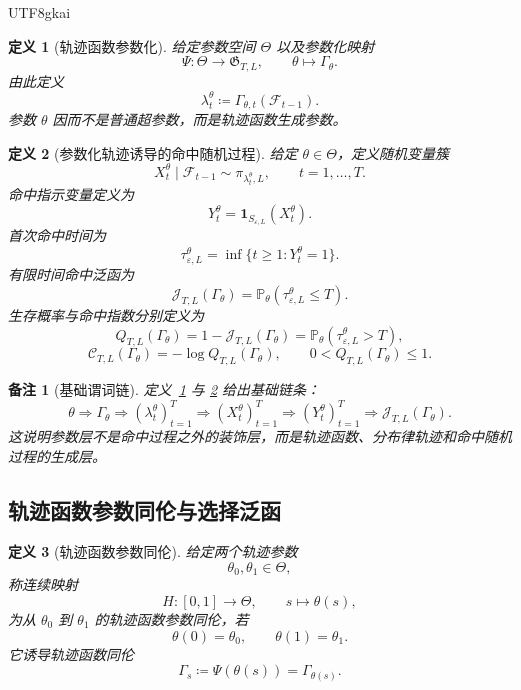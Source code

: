 \documentclass[12pt]{article}
\newtheorem{definition}{定义}[section]
\newtheorem{remark}{备注}[section]
\newcommand{\DefEq}{\coloneqq}
\newcommand{\Prob}{\mathbb P}
\newcommand{\Fil}{\mathcal F}
\begin{document}
\begin{CJK*}{UTF8}{gkai}
\begin{definition}[轨迹函数参数化]
\label{def:tex57-parameterization}
给定参数空间 \(\Theta\) 以及参数化映射
\[
  \Psi:\Theta\to\mathfrak G_{T,L},
  \qquad
  \theta\mapsto\Gamma_\theta.
\]
由此定义
\[
  \lambda_t^\theta
  \DefEq
  \Gamma_{\theta,t}(\Fil_{t-1}).
\]
参数 \(\theta\) 因而不是普通超参数，而是轨迹函数生成参数。
\end{definition}

\begin{definition}[参数化轨迹诱导的命中随机过程]
\label{def:tex57-parameterized-hit-process}
给定 \(\theta\in\Theta\)，定义随机变量簇
\[
  X_t^\theta\mid\Fil_{t-1}
  \sim
  \pi_{\lambda_t^\theta,L},
  \qquad
  t=1,\ldots,T.
\]
命中指示变量定义为
\[
  Y_t^\theta
  =
  \mathbf 1_{S_{\varepsilon,L}}(X_t^\theta).
\]
首次命中时间为
\[
  \tau_{\varepsilon,L}^{\theta}
  =
  \inf\{t\ge1:Y_t^\theta=1\}.
\]
有限时间命中泛函为
\[
  \mathcal J_{T,L}(\Gamma_\theta)
  =
  \Prob_\theta(\tau_{\varepsilon,L}^{\theta}\le T).
\]
生存概率与命中指数分别定义为
\[
  Q_{T,L}(\Gamma_\theta)
  =
  1-\mathcal J_{T,L}(\Gamma_\theta)
  =
  \Prob_\theta(\tau_{\varepsilon,L}^{\theta}>T),
\]
\[
  \mathcal C_{T,L}(\Gamma_\theta)
  =
  -\log Q_{T,L}(\Gamma_\theta),
  \qquad
  0<Q_{T,L}(\Gamma_\theta)\le1.
\]
\end{definition}

\begin{remark}[基础谓词链]
定义~\ref{def:tex57-parameterization} 与
\ref{def:tex57-parameterized-hit-process} 给出基础链条：
\[
\boxed{
\theta
\Longrightarrow
\Gamma_\theta
\Longrightarrow
(\lambda_t^\theta)_{t=1}^{T}
\Longrightarrow
(X_t^\theta)_{t=1}^{T}
\Longrightarrow
(Y_t^\theta)_{t=1}^{T}
\Longrightarrow
\mathcal J_{T,L}(\Gamma_\theta).
}
\]
这说明参数层不是命中过程之外的装饰层，而是轨迹函数、分布律轨迹和命中随机过程的生成层。
\end{remark}

\subsection{轨迹函数参数同伦与选择泛函}
\label{subsec:tex57-homotopy-selection-functional}

\begin{definition}[轨迹函数参数同伦]
\label{def:tex57-parameter-homotopy}
给定两个轨迹参数
\[
  \theta_0,\theta_1\in\Theta,
\]
称连续映射
\[
  H:[0,1]\to\Theta,
  \qquad
  s\mapsto\theta(s),
\]
为从 \(\theta_0\) 到 \(\theta_1\) 的轨迹函数参数同伦，若
\[
  \theta(0)=\theta_0,
  \qquad
  \theta(1)=\theta_1.
\]
它诱导轨迹函数同伦
\[
  \Gamma_s
  \DefEq
  \Psi(\theta(s))
  =
  \Gamma_{\theta(s)}.
\]
\end{definition}


\end{CJK*}
\end{document}
